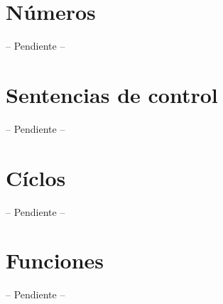 \documentclass[12pt]{article}
\begin{document}
    \section{Números}
    -- Pendiente --
    
    \section{Sentencias de control}
    -- Pendiente --

    \section{Cíclos}
    -- Pendiente --
    
    \section{Funciones}

    -- Pendiente --
\end{document}
